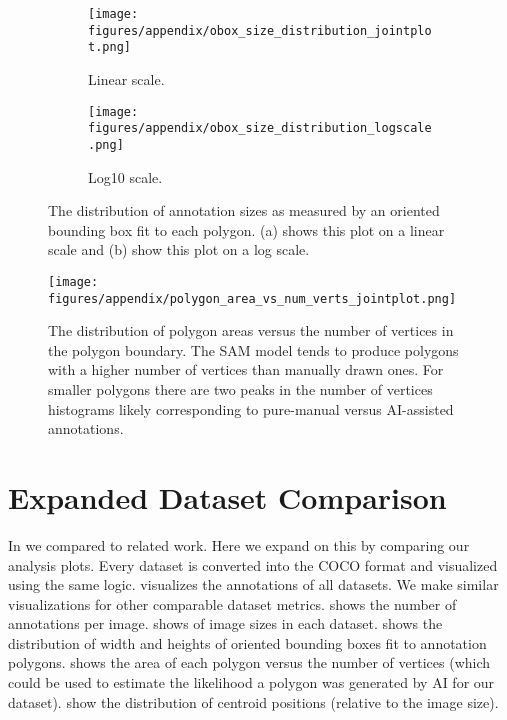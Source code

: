 \begin{figure}[ht]
\centering
\begin{subfigure}[b]{0.4\textwidth}
  \texttt{[image: figures/appendix/obox\_size\_distribution\_jointplot.png]}
  \caption{Linear scale.}
  \label{fig:annot_obox_size_dist_linear}
\end{subfigure}
\hfill
\begin{subfigure}[b]{0.4\textwidth}
  \texttt{[image: figures/appendix/obox\_size\_distribution\_logscale.png]}
  \caption{Log10 scale.}
  \label{fig:annot_obox_size_dist_log}
\end{subfigure}
\caption{The distribution of annotation sizes as measured by an oriented bounding box fit to each polygon. (a) shows this plot on a linear scale and (b) show this plot on a log scale.}
\label{fig:annot_obox_size_dist}
\end{figure}


\begin{figure}[ht]
\centering
\texttt{[image: figures/appendix/polygon\_area\_vs\_num\_verts\_jointplot.png]}
\caption[]{
    The distribution of polygon areas versus the number of vertices in the polygon boundary.
    The SAM model tends to produce polygons with a higher number of vertices
    than manually drawn ones.  For smaller polygons there are two peaks in the
    number of vertices histograms likely corresponding to pure-manual versus
    AI-assisted annotations.
}
\label{fig:annot_area_verts_distri}
\end{figure}


\section{Expanded Dataset Comparison}

In  we compared to related work. Here we expand on this
by comparing our analysis plots. Every dataset is converted into the COCO
format and visualized using the same logic. 
visualizes the annotations of all datasets. We make similar visualizations 
for other comparable dataset metrics.
 shows the number of annotations per image.
 shows of image sizes in each dataset.
 shows the distribution of width and heights of oriented bounding boxes fit to annotation polygons.
 shows the area of each polygon versus the number of vertices (which could be used to estimate the likelihood a polygon was generated by AI for our dataset).
 show the distribution of centroid positions (relative to the image size).


